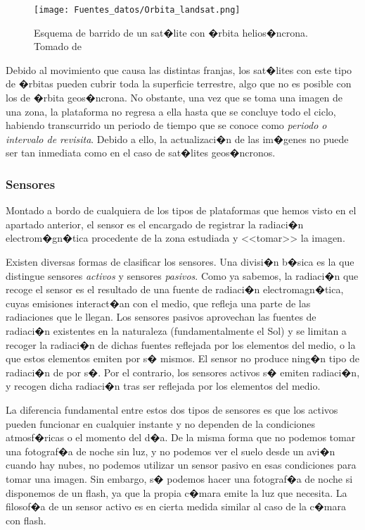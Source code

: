 \begin{itemize}
	
\begin{figure}[!hbt]   
\centering
\texttt{[image: Fuentes\_datos/Orbita\_landsat.png]}
\caption{\small Esquema de barrido de un sat�lite con �rbita helios�ncrona. Tomado de \cite{webLandsat}}
\label{Fig:Orbita_landsat} 
\end{figure}
	
	Debido al movimiento que causa las distintas franjas, los sat�lites con este tipo de �rbitas pueden cubrir toda la superficie terrestre, algo que no es posible con los de �rbita geos�ncrona. No obstante, una vez que se toma una imagen de una zona, la plataforma no regresa a ella hasta que se concluye todo el ciclo, habiendo transcurrido un periodo de tiempo que se conoce como \emph{periodo o intervalo de revisita}. Debido a ello, la actualizaci�n de las im�genes no puede ser tan inmediata como en el caso de sat�lites geos�ncronos. 
\end{itemize}

\subsubsection{Sensores} \label{Sensores}

Montado a bordo de cualquiera de los tipos de plataformas que hemos visto en el apartado anterior, el sensor es el encargado de registrar la radiaci�n electrom�gn�tica procedente de la zona estudiada y <<tomar>> la imagen.

Existen diversas formas de clasificar los sensores. Una divisi�n b�sica es la que distingue sensores \emph{activos} y sensores \emph{pasivos}. Como ya sabemos, la radiaci�n que recoge el sensor es el resultado de una fuente de radiaci�n electromagn�tica, cuyas emisiones interact�an con el medio, que refleja una parte de las radiaciones que le llegan. Los sensores pasivos aprovechan las fuentes de radiaci�n existentes en la naturaleza (fundamentalmente el Sol) y se limitan a recoger la radiaci�n de dichas fuentes reflejada por los elementos del medio, o la que estos elementos emiten por s� mismos. El sensor no produce ning�n tipo de radiaci�n de por s�. Por el contrario, los sensores activos s� emiten radiaci�n, y recogen dicha radiaci�n tras ser reflejada por los elementos del medio.


La diferencia fundamental entre estos dos tipos de sensores es que los activos pueden funcionar en cualquier instante y no dependen de la condiciones atmosf�ricas o el momento del d�a. De la misma forma que no podemos tomar una fotograf�a de noche sin luz, y no podemos ver el suelo desde un avi�n cuando hay nubes, no podemos utilizar un sensor pasivo en esas condiciones para tomar una imagen. Sin embargo, s� podemos hacer una fotograf�a de noche si disponemos de un flash, ya que la propia c�mara emite la luz que necesita. La filosof�a de un sensor activo es en cierta medida similar al caso de la c�mara con flash.

